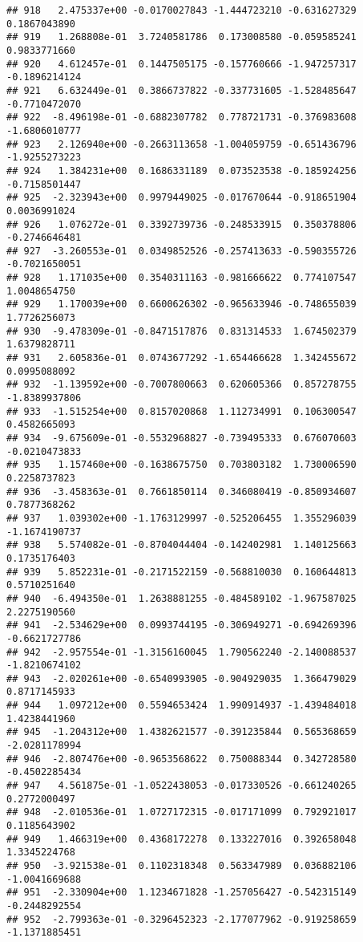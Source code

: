 \documentclass[
]{article}
\begin{document}
\begin{verbatim}
## 918   2.475337e+00 -0.0170027843 -1.444723210 -0.631627329  0.1867043890
## 919   1.268808e-01  3.7240581786  0.173008580 -0.059585241  0.9833771660
## 920   4.612457e-01  0.1447505175 -0.157760666 -1.947257317 -0.1896214124
## 921   6.632449e-01  0.3866737822 -0.337731605 -1.528485647 -0.7710472070
## 922  -8.496198e-01 -0.6882307782  0.778721731 -0.376983608 -1.6806010777
## 923   2.126940e+00 -0.2663113658 -1.004059759 -0.651436796 -1.9255273223
## 924   1.384231e+00  0.1686331189  0.073523538 -0.185924256 -0.7158501447
## 925  -2.323943e+00  0.9979449025 -0.017670644 -0.918651904  0.0036991024
## 926   1.076272e-01  0.3392739736 -0.248533915  0.350378806 -0.2746646481
## 927  -3.260553e-01  0.0349852526 -0.257413633 -0.590355726 -0.7021650051
## 928   1.171035e+00  0.3540311163 -0.981666622  0.774107547  1.0048654750
## 929   1.170039e+00  0.6600626302 -0.965633946 -0.748655039  1.7726256073
## 930  -9.478309e-01 -0.8471517876  0.831314533  1.674502379  1.6379828711
## 931   2.605836e-01  0.0743677292 -1.654466628  1.342455672  0.0995088092
## 932  -1.139592e+00 -0.7007800663  0.620605366  0.857278755 -1.8389937806
## 933  -1.515254e+00  0.8157020868  1.112734991  0.106300547  0.4582665093
## 934  -9.675609e-01 -0.5532968827 -0.739495333  0.676070603 -0.0210473833
## 935   1.157460e+00 -0.1638675750  0.703803182  1.730006590  0.2258737823
## 936  -3.458363e-01  0.7661850114  0.346080419 -0.850934607  0.7877368262
## 937   1.039302e+00 -1.1763129997 -0.525206455  1.355296039 -1.1674190737
## 938   5.574082e-01 -0.8704044404 -0.142402981  1.140125663  0.1735176403
## 939   5.852231e-01 -0.2171522159 -0.568810030  0.160644813  0.5710251640
## 940  -6.494350e-01  1.2638881255 -0.484589102 -1.967587025  2.2275190560
## 941  -2.534629e+00  0.0993744195 -0.306949271 -0.694269396 -0.6621727786
## 942  -2.957554e-01 -1.3156160045  1.790562240 -2.140088537 -1.8210674102
## 943  -2.020261e+00 -0.6540993905 -0.904929035  1.366479029  0.8717145933
## 944   1.097212e+00  0.5594653424  1.990914937 -1.439484018  1.4238441960
## 945  -1.204312e+00  1.4382621577 -0.391235844  0.565368659 -2.0281178994
## 946  -2.807476e+00 -0.9653568622  0.750088344  0.342728580 -0.4502285434
## 947   4.561875e-01 -1.0522438053 -0.017330526 -0.661240265  0.2772000497
## 948  -2.010536e-01  1.0727172315 -0.017171099  0.792921017  0.1185643902
## 949   1.466319e+00  0.4368172278  0.133227016  0.392658048  1.3345224768
## 950  -3.921538e-01  0.1102318348  0.563347989  0.036882106 -1.0041669688
## 951  -2.330904e+00  1.1234671828 -1.257056427 -0.542315149 -0.2448292554
## 952  -2.799363e-01 -0.3296452323 -2.177077962 -0.919258659 -1.1371885451

\end{verbatim}
\end{document}

